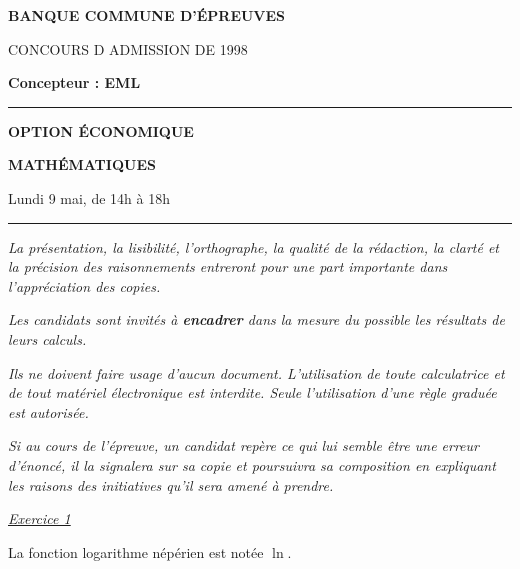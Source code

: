\documentclass[11pt]{article}%
\begin{document}

\begin{center}
{\LARG\E\textbf{BANQUE COMMUNE D'ÉPREUVES}}



{\large \textsc{CONCOURS D ADMISSION DE 1998}}



{\large \textbf{Concepteur : EML}}



\rule{2.39cm}{0.05cm}



{\Large \textbf{OPTION ÉCONOMIQUE}}



{\Large \textbf{MATHÉMATIQUES }}



{\Large Lundi 9 mai, de 14h à 18h}



\rule{2.39cm}{0.05cm}
\end{center}

\textit{La présentation, la lisibilité, l'orthographe, la qualité
de la rédaction, la clarté et la précision des raisonnements
entreront pour une part importante dans l'appréciation des copies.}

\textit{Les candidats sont invités à \textbf{encadrer} dans la mesure
du possible les résultats de leurs calculs.}

\textit{Ils ne doivent faire usage d'aucun document. L'utilisation de
toute
calculatrice et de tout matériel électronique est interdite. Seule
l'utilisation d'une règle graduée est autorisée.}

\textit{Si au cours de l'épreuve, un candidat repère ce qui lui semble
être une erreur d'énoncé, il la signalera sur sa copie et
poursuivra sa composition en expliquant les raisons des initiatives
qu'il sera
amené à prendre.}

\vspace*{3cm}

\begin{center}
{\large \textsl{\underline{Exercice 1}}}
\end{center}

La fonction logarithme népérien est notée $\ln$.
\end{document}
